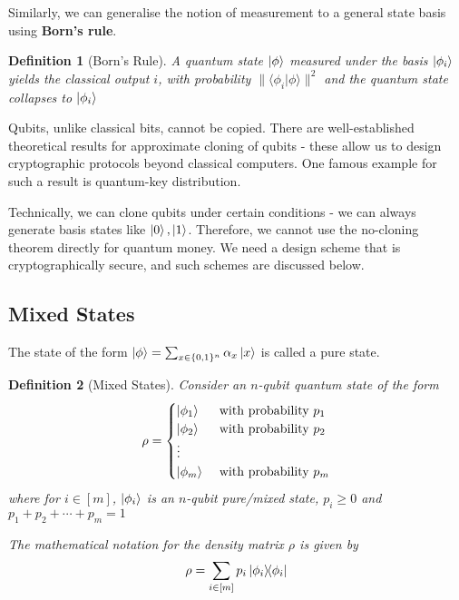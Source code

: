 \documentclass[]{article}
\newtheorem{definition}{Definition}
\newcommand{\iprodq}[2]{\langle #1 \vert #2 \rangle}
\begin{document}
Similarly, we can generalise the notion of measurement to a general state basis using \textbf{Born's rule}.  

\begin{definition}[Born's Rule]
    A quantum state $\ket{\phi}$ measured under the basis $\ket{\phi_i}$ yields the classical output $i$, with probability $\|\iprodq{\phi_i}{\phi}\|^2$ and the quantum state collapses to $\ket{\phi_i}$
\end{definition}

Qubits, unlike classical bits, cannot be copied. There are well-established theoretical results for approximate cloning of qubits - these allow us to design cryptographic protocols beyond classical computers. One famous example for such a result is quantum-key distribution.

Technically, we can clone qubits under certain conditions - we can always generate basis states like $\ket{0}, \ket{1}$. Therefore, we cannot use the no-cloning theorem directly for quantum money. We need a design scheme that is cryptographically secure, and such schemes are discussed below.

\subsection{Mixed States}
The state of the form $\ket{\phi} = \sum_{x \in \{0, 1\}^n} \alpha_x \ket{x}$ is called a pure state.

\begin{definition}[Mixed States]
    Consider an $n$-qubit quantum state of the form
    \begin{align}
        \rho = \begin{cases}
            \ket{\phi_1} & \text{ with probability } p_1 \\
            \ket{\phi_2} & \text{ with probability } p_2  \\
            \vdots & \\
            \ket{\phi_m} & \text{ with probability } p_m 
        \end{cases}
    \end{align}
    where for $i \in [m]$, $\ket{\phi_i}$ is an $n$-qubit pure/mixed state, $p_i \geq 0$ and $p_1 + p_2 + \cdots + p_m = 1$

    The mathematical notation for the density matrix $\rho$ is given by
    \begin{align}
        \rho = \sum_{i \in [m]} p_i \ketbra{\phi_i}{\phi_i}
    \end{align}
\end{definition}
\end{document}
